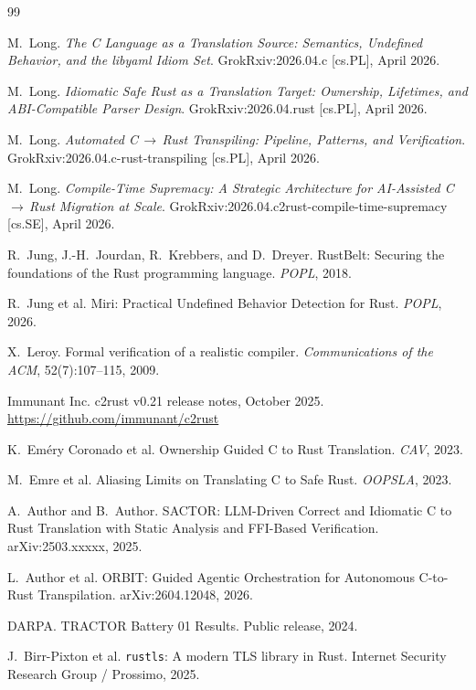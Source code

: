 \documentclass[12pt]{article}
\theoremstyle{definition}
\theoremstyle{remark}
\begin{document}
\begin{thebibliography}{99}

 M.~Long. \emph{The C Language as a Translation Source: Semantics, Undefined Behavior, and the libyaml Idiom Set}. GrokRxiv:2026.04.c [cs.PL], April 2026.

 M.~Long. \emph{Idiomatic Safe Rust as a Translation Target: Ownership, Lifetimes, and ABI-Compatible Parser Design}. GrokRxiv:2026.04.rust [cs.PL], April 2026.

 M.~Long. \emph{Automated C\,$\to$\,Rust Transpiling: Pipeline, Patterns, and Verification}. GrokRxiv:2026.04.c-rust-transpiling [cs.PL], April 2026.

 M.~Long. \emph{Compile-Time Supremacy: A Strategic Architecture for AI-Assisted C\,$\to$\,Rust Migration at Scale}. GrokRxiv:2026.04.c2rust-compile-time-supremacy [cs.SE], April 2026.

 R.~Jung, J.-H.~Jourdan, R.~Krebbers, and D.~Dreyer. RustBelt: Securing the foundations of the Rust programming language. \emph{POPL}, 2018.

 R.~Jung et al. Miri: Practical Undefined Behavior Detection for Rust. \emph{POPL}, 2026.

 X.~Leroy. Formal verification of a realistic compiler. \emph{Communications of the ACM}, 52(7):107--115, 2009.

 Immunant Inc. c2rust v0.21 release notes, October 2025. \url{https://github.com/immunant/c2rust}

 K.~Em\'ery Coronado et al. Ownership Guided C to Rust Translation. \emph{CAV}, 2023.

 M.~Emre et al. Aliasing Limits on Translating C to Safe Rust. \emph{OOPSLA}, 2023.

 A.~Author and B.~Author. SACTOR: LLM-Driven Correct and Idiomatic C to Rust Translation with Static Analysis and FFI-Based Verification. arXiv:2503.xxxxx, 2025.

 L.~Author et al. ORBIT: Guided Agentic Orchestration for Autonomous C-to-Rust Transpilation. arXiv:2604.12048, 2026.

 DARPA. TRACTOR Battery 01 Results. Public release, 2024.

 J.~Birr-Pixton et al. \texttt{rustls}: A modern TLS library in Rust. Internet Security Research Group / Prossimo, 2025.


\end{thebibliography}
\end{document}
